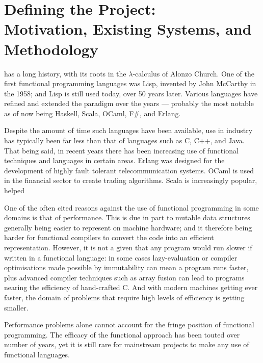 \chapter[Defining the Project: Motivation, Existing Systems, and Methodology]{Defining the Project: \\Motivation, Existing Systems, and Methodology}
\label{ch:motivation}


 has a long history, with its roots in the $\lambda$-calculus of Alonzo Church. One of the first functional programming languages was Lisp, invented by John McCarthy in the 1958; and Lisp is still used today, over 50 years later. Various languages have refined and extended the paradigm over the years --- probably the most notable as of now being Haskell, Scala, OCaml, F\#, and Erlang.

Despite the amount of time such languages have been available, use in industry has typically been far less than that of languages such as C, C++, and Java. That being said, in recent years there has been increasing use of functional techniques and languages in certain areas. Erlang was designed for the development of highly fault tolerant telecommunication systems.\cite[-1em]{armstrong2007history} OCaml is used in the financial sector to create trading algorithms. Scala is increasingly popular, helped 

One of the often cited reasons against the use of functional programming in some domains is that of performance. This is due in part to mutable data structures generally being easier to represent on machine hardware; and it therefore being harder for functional compilers to convert the code into an efficient representation. However, it is not a given that any program would run slower if written in a functional language: in some cases lazy-evaluation or compiler optimisations made possible by immutability can mean a program runs faster, plus advanced compiler techniques such as array fusion can lead to programs nearing the efficiency of hand-crafted C. And with modern machines getting ever faster, the domain of problems that require high levels of efficiency is getting smaller.

Performance problems alone cannot account for the fringe position of functional programming. The efficacy of the functional approach has been touted over number of years, yet it is still rare for mainstream projects to make any use of functional languages.

